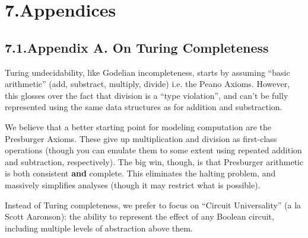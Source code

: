 \documentclass[preprint]{{acmart}}
\begin{document}
\section{7.\hspace*{0.5em}Appendices}\label{sec-appendices}%

\subsection{7.1.\hspace*{0.5em}Appendix A. On Turing Completeness}\label{sec-appendix-a-on-turing-completeness}%

\noindent{}Turing undecidability, like Godelian incompleteness, starts by assuming
\textquotedblleft{}basic arithmetic\textquotedblright{} (add, substract, multiply, divide) \textendash{} i.e. the Peano
Axioms. However, this glosses over the fact that division is a \textquotedblleft{}type
violation\textquotedblright{}, and can't be fully represented using the same data structures
as for addition and substraction.%

We believe that a better starting point for modeling computation are the
Presburger Axioms. These give up multiplication and division as
first-class operations (though you can emulate them to some extent using
repeated addition and subtraction, respectively). The big win, though, is
that Presburger arithmetic is both consistent \textbf{and} complete. This
eliminates the halting problem, and massively simplifies analyses (though
it may restrict what is possible).%

Instead of Turing completeness, we prefer to focus on \textquotedblleft{}Circuit
Universality\textquotedblright{} (a la Scott Aaronson): the ability to represent the effect
of any Boolean circuit, including multiple levels of abstraction above
them.%
\end{document}
